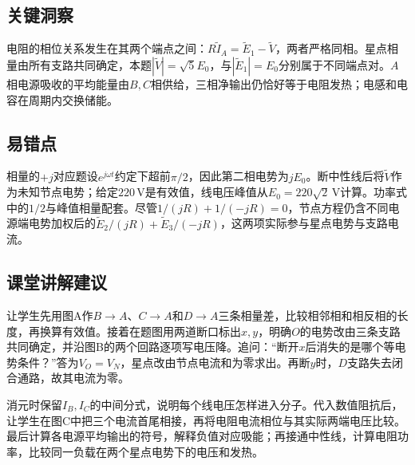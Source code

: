 \documentclass[UTF8,fontset=fandol,a4paper,11pt]{ctexart}
\begin{document}


\subsection*{关键洞察}

电阻的相位关系发生在其两个端点之间：$R\widetilde I_A=\widetilde E_1-\widetilde V$，两者严格同相。星点相量由所有支路共同确定，本题$|\widetilde V|=\sqrt5E_0$，与$|\widetilde E_1|=E_0$分别属于不同端点对。$A$相电源吸收的平均能量由$B,C$相供给，三相净输出仍恰好等于电阻发热；电感和电容在周期内交换储能。



\subsection*{易错点}

相量的$+j$对应题设$e^{j\omega t}$约定下超前$\pi/2$，因此第二相电势为$jE_0$。断中性线后将$\widetilde V$作为未知节点电势；给定$220\,\mathrm V$是有效值，线电压峰值从$E_0=220\sqrt2\,\mathrm V$计算。功率式中的$1/2$与峰值相量配套。尽管$1/(jR)+1/(-jR)=0$，节点方程仍含不同电源端电势加权后的$\widetilde E_2/(jR)+\widetilde E_3/(-jR)$，这两项实际参与星点电势与支路电流。



\subsection*{课堂讲解建议}

让学生先用图A作$B\to A$、$C\to A$和$D\to A$三条相量差，比较相邻相和相反相的长度，再换算有效值。接着在题图用两道断口标出$x,y$，明确$O$的电势改由三条支路共同确定，并沿图B的两个回路逐项写电压降。追问：“断开$x$后消失的是哪个等电势条件？”答为$V_O=V_N$，星点改由节点电流和为零求出。再断$y$时，$D$支路失去闭合通路，故其电流为零。

消元时保留$I_B,I_C$的中间分式，说明每个线电压怎样进入分子。代入数值阻抗后，让学生在图C中把三个电流首尾相接，再将电阻电流相位与其实际两端电压比较。最后计算各电源平均输出的符号，解释负值对应吸能；再接通中性线，计算电阻功率，比较同一负载在两个星点电势下的电压和发热。


\end{document}
